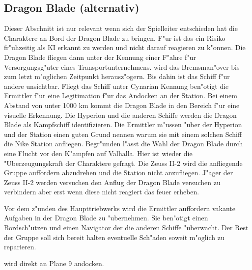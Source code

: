 \subsection{Dragon Blade (alternativ)}
Dieser Abschnitt ist nur relevant wenn sich der Spielleiter entschieden hat die Charaktere an Bord der Dragon Blade zu bringen. F"ur \xl{} ist das ein Risiko fr"uhzeitig als KI erkannt zu werden und nicht darauf reagieren zu k"onnen. Die Dragon Blade fliegen dann unter der Kennung einer F"ahre f"ur Versorgungsg"uter eines Transportunternehmens. \xl{} wird das Bremsman"over bis zum letzt m"oglichen Zeitpunkt herausz"ogern. Bis dahin ist das Schiff f"ur andere unsichtbar. Fliegt das Schiff unter Cynarian Kennung ben"otigt \xl{} die Ermittler f"ur eine Legitimation f"ur das Andocken an der Station. Bei einem Abstand von unter 1000 km kommt die Dragon Blade in den Bereich f"ur eine visuelle Erkennung. Die Hyperion und die anderen Schiffe werden die Dragon Blade als Kampfschiff identifizieren. Die Ermittler m"ussen "uber der Hyperion und der Station einen guten Grund nennen warum sie mit einem solchen Schiff die Nike Station anfliegen. Begr"unden l"asst die Wahl der Dragon Blade durch eine Flucht vor den K"ampfen auf Valhalla. Hier ist wieder die "Uberzeugungskraft der Charaktere gefragt. Die Zeuss II-2 wird die anfliegende Gruppe auffordern abzudrehen und die Station nicht anzufliegen. J"ager der Zeuss II-2 werden versuchen den Anflug der Dragon Blade versuchen zu verbindern aber erst wenn diese nicht reagiert das feuer erheben. 

Vor dem z"unden des Haupttriebwerks wird \xl{} die Ermittler auffordern vakante Aufgaben in der Dragon Blade zu "ubernehmen. Sie ben"otigt einen Bordsch"utzen und einen Navigator der die anderen Schiffe "uberwacht. Der Rest der Gruppe soll sich bereit halten eventuelle Sch"aden soweit m"oglich zu reparieren.

\xl{} wird direkt an Plane 9 andocken.
\vfill

